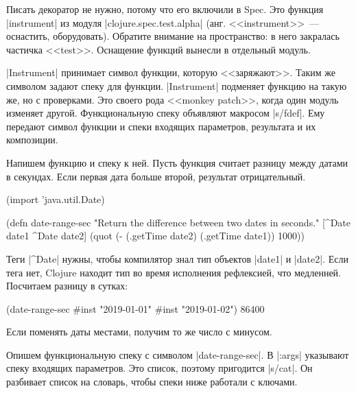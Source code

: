 
Писать декоратор не нужно, потому что его включили в Spec. Это функция
\spverb|instrument| из модуля \spverb|clojure.spec.test.alpha|
(анг. <<instrument>>~--- оснастить, оборудовать). Обратите внимание на пространство:
в него закралась частичка <<test>>. Оснащение функций вынесли в отдельный
модуль.


\spverb|Instrument| принимает символ функции, которую <<заряжают>>. Таким же
символом задают спеку для функции. \spverb|Instrument| подменяет функцию на
такую же, но с проверками. Это своего рода <<monkey
patch>>, когда один модуль
изменяет другой. Функциональную спеку объявляют макросом \spverb|s/fdef|. Ему
передают символ функции и спеки входящих параметров, результата и их композиции.


Напишем функцию и спеку к ней. Пусть функция считает разницу между датами в
секундах. Если первая дата больше второй, результат отрицательный.

\begin{english}
  \begin{clojure}
(import 'java.util.Date)

(defn date-range-sec
  "Return the difference between two dates in seconds."
  [^Date date1 ^Date date2]
  (quot (- (.getTime date2)
           (.getTime date1))
        1000))
  \end{clojure}
\end{english}

Теги \spverb|^Date| нужны, чтобы компилятор знал тип объектов \spverb|date1| и
\spverb|date2|. Если тега нет, Clojure находит тип во время исполнения
рефлексией, что медленней. Посчитаем разницу в сутках:

\begin{english}
  \begin{clojure}
(date-range-sec #inst "2019-01-01" #inst "2019-01-02")
86400
  \end{clojure}
\end{english}

\noindent
Если поменять даты местами, получим то же число с минусом.

Опишем функциональную спеку с символом \spverb|date-range-sec|. В \spverb|:args|
указывают спеку входящих параметров. Это список, поэтому пригодится
\spverb|s/cat|. Он разбивает список на словарь, чтобы спеки ниже работали с
ключами.

